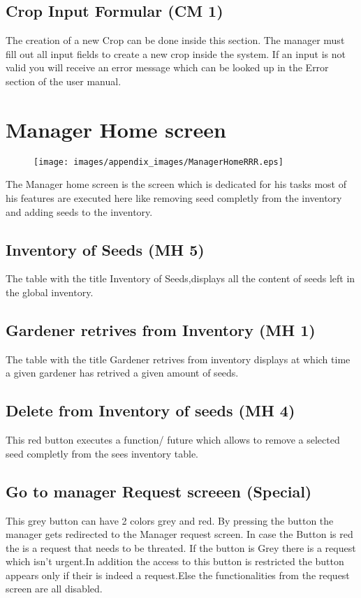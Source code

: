 \subsection{Crop Input Formular (CM 1)}
The creation of a new Crop can be done inside this section. The manager must
fill out all input fields to create a new crop inside the system. If an input is
not valid you will receive an error message which can be looked up in the Error
section of the user manual.





\section{Manager Home screen}
\label{sec:appendix_Manager_Home_Screen}

\begin{figure}[H]
\texttt{[image: images/appendix\_images/ManagerHomeRRR.eps]}
\end{figure}

The Manager home screen is the screen which is dedicated for his tasks most of
his features are executed here like removing seed completly from the inventory
and adding seeds to the inventory.


\subsection{Inventory of Seeds (MH 5)}
The table with the title Inventory of Seeds,displays all the content of seeds
left in the global inventory.

\subsection{Gardener retrives from Inventory (MH 1)}
The table with the title Gardener retrives from inventory displays at which time
a given gardener has retrived a given amount of seeds.

\subsection{Delete from Inventory of seeds (MH 4)}
This red button executes a function/ future which allows to remove a selected
seed completly from the sees inventory table.

\subsection{Go to manager Request screeen (Special)}
This grey button can have 2 colors grey and red. By pressing the button the
manager gets redirected to the Manager request screen. In case the Button is red
the is a request that needs to be threated. If the button is Grey there is a
request which isn't urgent.In addition the access to this button is restricted
the button appears only if their is indeed a request.Else the functionalities
from the request screen are all disabled.

